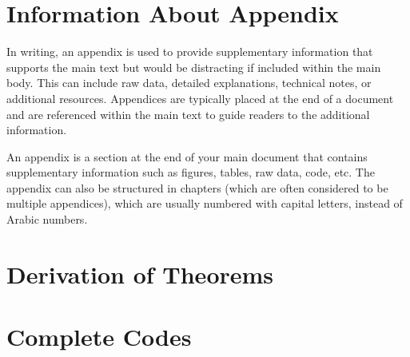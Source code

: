 \appendix
\chapter{Information About Appendix}
In writing, an appendix is used to provide supplementary information that supports the main text but would be distracting if included within the main body. This can include raw data, detailed explanations, technical notes, or additional resources. Appendices are typically placed at the end of a document and are referenced within the main text to guide readers to the additional information.

An appendix is a section at the end of your main document that contains supplementary information such as figures, tables, raw data, code, etc. The appendix can also be structured in chapters (which are often considered to be multiple appendices), which are usually numbered with capital letters, instead of Arabic numbers.

\chapter{Derivation of Theorems}
	\lipsum[1-10]
	
\chapter{Complete Codes}
	\lipsum[1-5]
